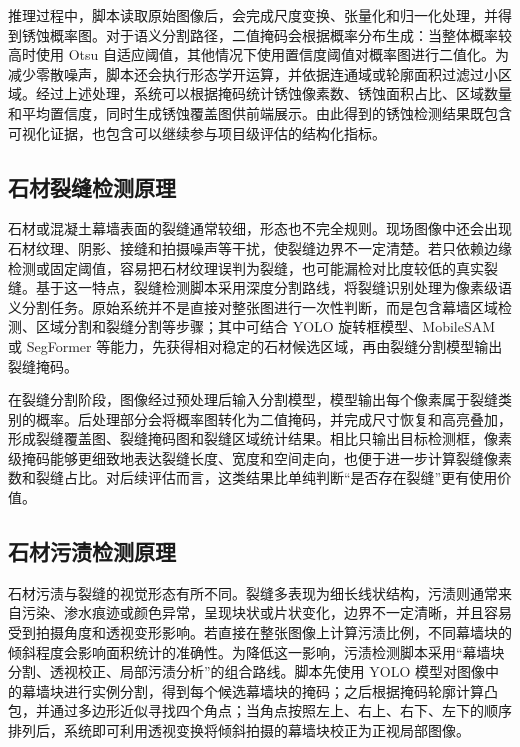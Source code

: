 推理过程中，脚本读取原始图像后，会完成尺度变换、张量化和归一化处理，并得到锈蚀概率图。对于语义分割路径，二值掩码会根据概率分布生成：当整体概率较高时使用 Otsu 自适应阈值，其他情况下使用置信度阈值对概率图进行二值化。为减少零散噪声，脚本还会执行形态学开运算，并依据连通域或轮廓面积过滤过小区域。经过上述处理，系统可以根据掩码统计锈蚀像素数、锈蚀面积占比、区域数量和平均置信度，同时生成锈蚀覆盖图供前端展示。由此得到的锈蚀检测结果既包含可视化证据，也包含可以继续参与项目级评估的结构化指标。

\subsection{石材裂缝检测原理}
\label{sec:foundation-stone-crack-detection-principle}

石材或混凝土幕墙表面的裂缝通常较细，形态也不完全规则。现场图像中还会出现石材纹理、阴影、接缝和拍摄噪声等干扰，使裂缝边界不一定清楚。若只依赖边缘检测或固定阈值，容易把石材纹理误判为裂缝，也可能漏检对比度较低的真实裂缝。基于这一特点，裂缝检测脚本采用深度分割路线，将裂缝识别处理为像素级语义分割任务。原始系统并不是直接对整张图进行一次性判断，而是包含幕墙区域检测、区域分割和裂缝分割等步骤；其中可结合 YOLO 旋转框模型、MobileSAM 或 SegFormer 等能力，先获得相对稳定的石材候选区域，再由裂缝分割模型输出裂缝掩码\cite{xie2021segformer,kirillov2023sam}。

在裂缝分割阶段，图像经过预处理后输入分割模型，模型输出每个像素属于裂缝类别的概率。后处理部分会将概率图转化为二值掩码，并完成尺寸恢复和高亮叠加，形成裂缝覆盖图、裂缝掩码图和裂缝区域统计结果。相比只输出目标检测框，像素级掩码能够更细致地表达裂缝长度、宽度和空间走向，也便于进一步计算裂缝像素数和裂缝占比。对后续评估而言，这类结果比单纯判断“是否存在裂缝”更有使用价值。

\subsection{石材污渍检测原理}
\label{sec:foundation-stone-stain-detection-principle}

石材污渍与裂缝的视觉形态有所不同。裂缝多表现为细长线状结构，污渍则通常来自污染、渗水痕迹或颜色异常，呈现块状或片状变化，边界不一定清晰，并且容易受到拍摄角度和透视变形影响。若直接在整张图像上计算污渍比例，不同幕墙块的倾斜程度会影响面积统计的准确性。为降低这一影响，污渍检测脚本采用“幕墙块分割、透视校正、局部污渍分析”的组合路线。脚本先使用 YOLO 模型对图像中的幕墙块进行实例分割，得到每个候选幕墙块的掩码；之后根据掩码轮廓计算凸包，并通过多边形近似寻找四个角点；当角点按照左上、右上、右下、左下的顺序排列后，系统即可利用透视变换将倾斜拍摄的幕墙块校正为正视局部图像。

